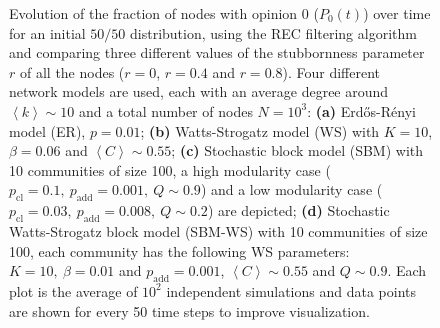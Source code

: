 \documentclass[11 pt , letterpaper , twoside , openright]{book}
\begin{document}
\begin{figure}[H]
  \caption[Evolution of the fraction of nodes with opinion 0 ($P_0(t)$) over time for an initial $50/50$ opinion distribution, using the REC filtering algorithm and comparing three different values of the stubbornness parameter $r$ of all the nodes ($r = 0$, $r = 0.4$ and $r = 0.8$).]{Evolution of the fraction of nodes with opinion 0 ($P_0(t)$) over time for an initial $50/50$ distribution, using the REC filtering algorithm and comparing three different values of the stubbornness parameter $r$ of all the nodes ($r = 0$, $r = 0.4$ and $r = 0.8$). Four different network models are used, each with an average degree around $\left<k\right> \sim 10$ and a total number of nodes $N = 10^3$: \textbf{(a)} Erd\H{o}s-R\'{e}nyi model (ER), $p=0.01$; \textbf{(b)} Watts-Strogatz model (WS) with $K = 10$, $\beta = 0.06$ and $\left<C\right> \sim 0.55$; \textbf{(c)} Stochastic block model (SBM) with 10 communities of size 100, a high modularity case ($p_{\text{cl}} = 0.1,\ p_{\text{add}} = 0.001,\ Q \sim 0.9$) and a low modularity case ($p_{\text{cl}} = 0.03,\ p_{\text{add}} = 0.008,\ Q \sim 0.2$) are depicted; \textbf{(d)} Stochastic Watts-Strogatz block model (SBM-WS) with 10 communities of size 100, each community has the following WS parameters: $K = 10,\ \beta = 0.01$ and $p_{\text{add}} = 0.001$, $\left<C\right> \sim 0.55$ and $Q \sim 0.9$. Each plot is the average of $10^2$ independent simulations and data points are shown for every 50 time steps to improve visualization.}%
\label{ev_op_50_50_all_frac_stubb_REC}
\end{figure}
\end{document}
